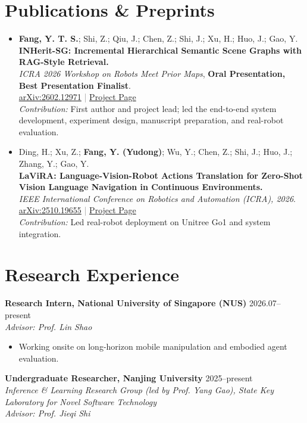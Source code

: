 \documentclass[11pt,a4paper]{article}
\newcommand{\sep}{\hspace{0.5em}\textcolor{gray}{|}\hspace{0.5em}}
\begin{document}
\section{Publications \& Preprints}
\begin{itemize}
  \item \textbf{Fang, Y. T. S.}; Shi, Z.; Qiu, J.; Chen, Z.; Shi, J.; Xu, H.; Huo, J.; Gao, Y.\\
  \textbf{INHerit-SG: Incremental Hierarchical Semantic Scene Graphs with RAG-Style Retrieval.}\\
  \textit{ICRA 2026 Workshop on Robots Meet Prior Maps}, \textbf{Oral Presentation, Best Presentation Finalist}.\\
  \href{https://arxiv.org/abs/2602.12971}{arXiv:2602.12971} \sep
  \href{https://fangyuktung.github.io/INHeritSG.github.io/}{Project Page}\\
  \textit{Contribution:} First author and project lead; led the end-to-end system development, experiment design, manuscript preparation, and real-robot evaluation.

  \item Ding, H.; Xu, Z.; \textbf{Fang, Y. (Yudong)}; Wu, Y.; Chen, Z.; Shi, J.; Huo, J.; Zhang, Y.; Gao, Y.\\
  \textbf{LaViRA: Language-Vision-Robot Actions Translation for Zero-Shot Vision Language Navigation in Continuous Environments.}\\
  \textit{IEEE International Conference on Robotics and Automation (ICRA), 2026}.
  \href{https://arxiv.org/abs/2510.19655}{arXiv:2510.19655} \sep
  \href{https://robo-lavira.github.io/lavira-zs-vln/}{Project Page}\\
  \textit{Contribution:} Led real-robot deployment on Unitree Go1 and system integration.
\end{itemize}

\section{Research Experience}
\textbf{Research Intern, National University of Singapore (NUS)} \hfill 2026.07--present\\[-1pt]
\textit{Advisor: Prof. Lin Shao}
\begin{itemize}
  \item Working onsite on long-horizon mobile manipulation and embodied agent evaluation.
\end{itemize}

\textbf{Undergraduate Researcher, Nanjing University} \hfill 2025--present\\[-1pt]
\textit{Inference \& Learning Research Group (led by Prof. Yang Gao), State Key Laboratory for Novel Software Technology}\\[-1pt]
\textit{Advisor: Prof. Jieqi Shi}
\end{document}
